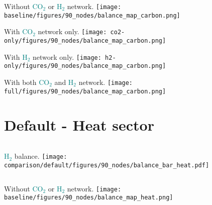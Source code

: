 \documentclass[12pt, aspectratio=169]{beamer}
\newcommand{\carbon}{\textcolor{teal}{CO$_2$}}
\newcommand{\hydrogen}{\textcolor{teal}{H$_2$}}
\begin{document}
\begin{frame}
    \begin{center}
    Without \carbon{} or \hydrogen{} network.
    \texttt{[image: baseline/figures/90\_nodes/balance\_map\_carbon.png]}
    \end{center}
\end{frame}


\begin{frame}
    \begin{center}
    With \carbon{} network only.
    \texttt{[image: co2-only/figures/90\_nodes/balance\_map\_carbon.png]}
    \end{center}
\end{frame}

\begin{frame}
    \begin{center}
    With \hydrogen{} network only.
    \texttt{[image: h2-only/figures/90\_nodes/balance\_map\_carbon.png]}
    \end{center}
\end{frame}


\begin{frame}
    \begin{center}
    With both \carbon{}  and \hydrogen{} network.
    \texttt{[image: full/figures/90\_nodes/balance\_map\_carbon.png]}
    \end{center}
\end{frame}





\section*{Default - Heat sector}

\begin{frame}
    \begin{columns}
        \hydrogen{} balance.
        \texttt{[image: comparison/default/figures/90\_nodes/balance\_bar\_heat.pdf]}
    \end{columns}
\end{frame}


\begin{frame}
    \begin{center}
    Without \carbon{} or \hydrogen{} network.
    \texttt{[image: baseline/figures/90\_nodes/balance\_map\_heat.png]}
    \end{center}
\end{frame}
\end{document}
